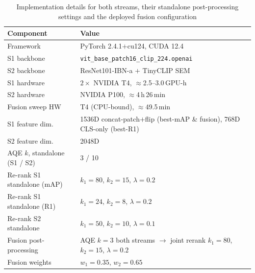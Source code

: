 \begin{table}[!t]
  \centering
  \caption{Implementation details for both streams, their standalone
  post-processing settings and the deployed fusion configuration}
  \label{tab:implementation}
  \small
  \begin{tabular}{L{5.4cm}L{8.4cm}}
    \toprule
    Component & Value \\
    \midrule
    Framework            & PyTorch 2.4.1$+$cu124, CUDA 12.4 \\
    S1 backbone          & \texttt{vit\_base\_\allowbreak patch16\_\allowbreak clip\_\allowbreak 224.openai} \\
    S2 backbone          & ResNet101-IBN-a $+$ TinyCLIP SEM \\
    S1 hardware          & $2\times$ NVIDIA T4, $\approx$2.5--3.0\,GPU-h \\
    S2 hardware          & NVIDIA P100, $\approx$4\,h\,26\,min \\
    Fusion sweep HW      & T4 (CPU-bound), $\approx$49.5\,min \\
    S1 feature dim.      & 1536D concat-patch$+$flip (best-mAP \& fusion),
                           768D CLS-only (best-R1) \\
    S2 feature dim.      & 2048D \\
    AQE $k$, standalone (S1 / S2) & 3 / 10 \\
    Re-rank S1 standalone (mAP)   & $k_1{=}80$, $k_2{=}15$, $\lambda{=}0.2$ \\
    Re-rank S1 standalone (R1)    & $k_1{=}24$, $k_2{=}8$, $\lambda{=}0.2$ \\
    Re-rank S2 standalone         & $k_1{=}50$, $k_2{=}10$, $\lambda{=}0.1$ \\
    Fusion post-processing        & AQE $k{=}3$ both streams $\to$ joint
                                    rerank $k_1{=}80$, $k_2{=}15$,
                                    $\lambda{=}0.2$ \\
    Fusion weights                & $w_1{=}0.35$, $w_2{=}0.65$ \\
    \bottomrule
  \end{tabular}
\end{table}

